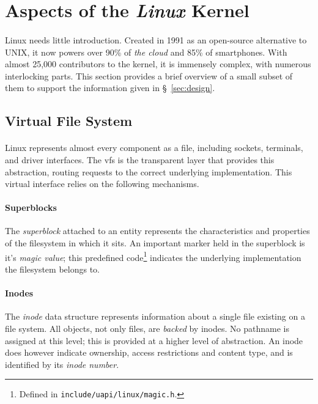 
\section{Aspects of the \textit{Linux} Kernel}

\paragraph{} Linux needs little introduction. Created in 1991 as an open-source alternative to UNIX, it now powers over 90\% of \textit{the cloud} and 85\% of smartphones. With almost 25,000 contributors to the kernel, it is immensely complex, with numerous interlocking parts. This section provides a brief overview of a small subset of them to support the information given in §~\ref{sec:design}.

\subsection{Virtual File System}

\paragraph{} Linux represents almost every component as a file, including sockets, terminals, and driver interfaces. The \acrshort{vfs} is the transparent layer that provides this abstraction, routing requests to the correct underlying implementation. This virtual interface relies on the following mechanisms.

\paragraph{Superblocks} The \textit{superblock} attached to an entity represents the characteristics and properties of the filesystem in which it sits. An important marker held in the superblock is it's \textit{magic value}; this predefined code\footnote{Defined in \texttt{include/uapi/linux/magic.h}.} indicates the underlying implementation the filesystem belongs to.

\paragraph{Inodes} The \textit{inode} data structure represents information about a single file existing on a file system. All objects, not only files, are \textit{backed} by inodes. No pathname is assigned at this level; this is provided at a higher level of abstraction. An inode does however indicate ownership, access restrictions and content type, and is identified by its \textit{inode number}.

